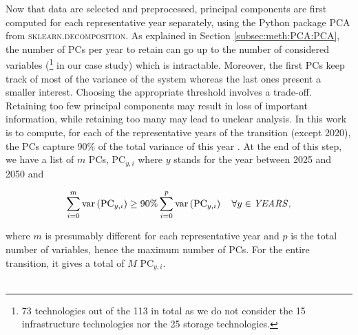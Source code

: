 \noindent
Now that data are selected and preprocessed, principal components are first computed for each representative year separately, using the Python package \textsc{PCA} from \textsc{sklearn.decomposition}. As explained in Section \ref{subsec:meth:PCA:PCA}, the number of PCs per year to retain can go up to the number of considered variables (\footnote{73 technologies out of the 113 in total as we do not consider the 15 infrastructure technologies nor the 25 storage technologies.} in our case study) which is intractable. Moreover, the first PCs keep track of most of the variance of the system whereas the last ones present a smaller interest. Choosing the appropriate threshold involves a trade-off. Retaining too few principal components may result in loss of important information, while retaining too many may lead to unclear analysis. In this work is to compute, for each of the representative years of the transition (except 2020),  the PCs capture 90\% of the total variance of this year \cite{jolliffe2002principal}. At the end of this step, we have a list of $m$ PCs, \ie $\text{PC}_{y,i}$ where $y$ stands for the year between 2025 and 2050 and 

\begin{equation}
\label{eq:PC_year}
\sum_{i=0}^m\text{var}\left(\text{PC}_{y,i}\right)\geq 90\% \sum_{i=0}^p\text{var}\left(\text{PC}_{y,i}\right) \quad \forall y \in \text{\emph{YEARS}},
\end{equation}

\noindent
where $m$ is presumably different for each representative year and $p$ is the total number of variables, hence the maximum number of PCs. For the entire transition, it gives a total of $M$ $\text{PC}_{y,i}$.\\

\\

